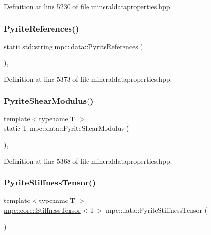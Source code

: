 Definition at line 5230 of file mineraldataproperties.\+hpp.

\mbox{\label{namespacempc_1_1data_a361dab9c71af9058ea800574b7873cc4}} 
\subsubsection{\texorpdfstring{Pyrite\+References()}{PyriteReferences()}}
{\footnotesize\ttfamily static std\+::string mpc\+::data\+::\+Pyrite\+References (\begin{DoxyParamCaption}{ }\end{DoxyParamCaption})\hspace{0.3cm}{\ttfamily [inline]}, {\ttfamily [static]}}



Definition at line 5373 of file mineraldataproperties.\+hpp.

\mbox{\label{namespacempc_1_1data_adf03f9645c0a6928fa9c018215058b2a}} 
\subsubsection{\texorpdfstring{Pyrite\+Shear\+Modulus()}{PyriteShearModulus()}}
{\footnotesize\ttfamily template$<$typename T $>$ \\
static T mpc\+::data\+::\+Pyrite\+Shear\+Modulus (\begin{DoxyParamCaption}{ }\end{DoxyParamCaption})\hspace{0.3cm}{\ttfamily [inline]}, {\ttfamily [static]}}



Definition at line 5368 of file mineraldataproperties.\+hpp.

\mbox{\label{namespacempc_1_1data_ac0c01cf5a1a454b325b77d7a14925409}} 
\subsubsection{\texorpdfstring{Pyrite\+Stiffness\+Tensor()}{PyriteStiffnessTensor()}}
{\footnotesize\ttfamily template$<$typename T $>$ \\
\mbox{\hyperlink{structmpc_1_1core_1_1_stiffness_tensor}{mpc\+::core\+::\+Stiffness\+Tensor}}$<$T$>$ mpc\+::data\+::\+Pyrite\+Stiffness\+Tensor (\begin{DoxyParamCaption}{ }\end{DoxyParamCaption})}



